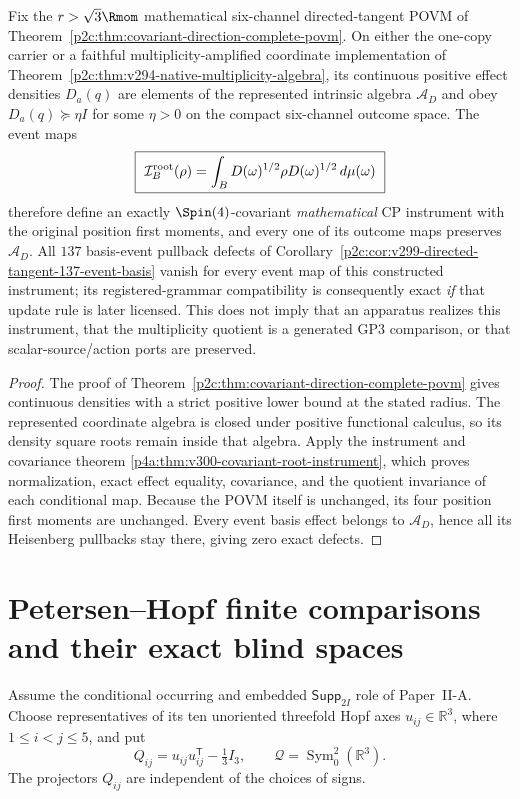 \documentclass[12pt,a4paper]{article}
\begin{document}
\begin{corollary}
\label{p2c:cor:v300-directed-tangent-luders}
Fix the $r>\sqrt3\Rmom$ mathematical six-channel directed-tangent
POVM of Theorem~\ref{p2c:thm:covariant-direction-complete-povm}.
On either the one-copy carrier or a faithful multiplicity-amplified
coordinate implementation of
Theorem~\ref{p2c:thm:v294-native-multiplicity-algebra}, its continuous
positive effect densities $D_a(q)$ are elements of the represented
intrinsic algebra $\mathcal A_D$ and obey $D_a(q)\succeq\eta I$
for some $\eta>0$ on the compact six-channel outcome space.
The event maps
\[
 \boxed{\ \mathcal I_B^{\rm root}(\rho)=\int_B
 D(\omega)^{1/2}\rho D(\omega)^{1/2}\,d\mu(\omega)\ }
\]
therefore define an exactly $\Spin(4)$-covariant \emph{mathematical}
CP instrument with the original position first moments, and every
one of its outcome maps preserves $\mathcal A_D$.
All $137$ basis-event pullback defects of
Corollary~\ref{p2c:cor:v299-directed-tangent-137-event-basis}
vanish for every event map of this constructed instrument; its
registered-grammar compatibility is consequently exact \emph{if}
that update rule is later licensed. This does not imply that an
apparatus realizes this instrument, that the multiplicity quotient is
a generated GP3 comparison, or that scalar-source/action ports are
preserved.
\end{corollary}
\begin{proof}
The proof of Theorem~\ref{p2c:thm:covariant-direction-complete-povm}
gives continuous densities with a strict positive lower bound at the
stated radius. The represented coordinate algebra is closed under
positive functional calculus, so its density square roots remain
inside that algebra. Apply the instrument and covariance theorem
\ref{p4a:thm:v300-covariant-root-instrument}, which proves
normalization, exact effect equality, covariance, and the quotient
invariance of each conditional map. Because the POVM itself is
unchanged, its four position first moments are unchanged.
Every event basis effect belongs to $\mathcal A_D$, hence all its
Heisenberg pullbacks stay there, giving zero exact defects.
\end{proof}


\section{Petersen--Hopf finite comparisons and their exact blind spaces}
\label{p2c:sec:v318-axis-frame-readout}
Assume the conditional occurring and embedded $\mathsf{Supp}_{2I}$
role of Paper~II-A.  Choose representatives of its ten unoriented
threefold Hopf axes $u_{ij}\in\mathbb R^3$, where $1\le i<j\le5$,
and put
\[
 Q_{ij}=u_{ij}u_{ij}^{\mathsf T}-\tfrac13 I_3,
 \qquad \mathcal Q=\operatorname{Sym}^2_0(\mathbb R^3).
\]
The projectors $Q_{ij}$ are independent of the choices of signs.
\end{document}
